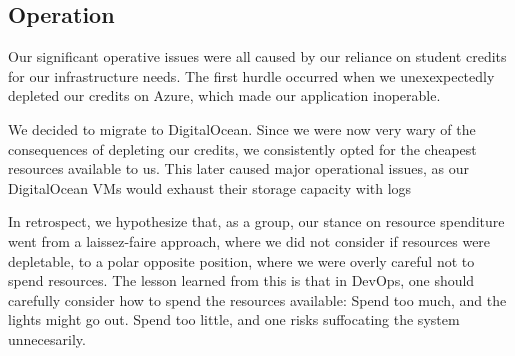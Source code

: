 \subsection{Operation}

Our significant operative issues were all caused by our reliance on student credits for our infrastructure needs.
The first hurdle occurred when we unexexpectedly depleted our credits on Azure,
which made our
application
inoperable.%

We decided to migrate to DigitalOcean.
Since we were now very wary of the consequences of depleting our credits, we consistently opted for the cheapest resources available to us.
This later caused major operational issues, as our DigitalOcean VMs would exhaust their storage capacity with logs%

In retrospect, we hypothesize that, as a group, our stance on resource spenditure went from a laissez-faire approach, where we did not consider if resources were depletable, to a polar opposite position, where we were overly careful not to spend resources.
The lesson learned from this is that in DevOps, one should carefully consider how to spend the resources available: Spend too much, and the lights might go out. Spend too little, and one risks suffocating the system unnecesarily.


